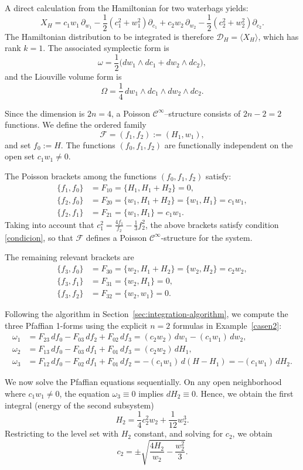 \documentclass{article}
\theoremstyle{remark}
\theoremstyle{definition}
\newcommand{\cinf}{$\mathcal{C}^{\infty}$}
\begin{document}
A direct calculation from the Hamiltonian for two waterbags yields:
\[
X_H
=
c_1 w_1\,\partial_{w_1}
-\frac12(c_1^2+w_1^2)\partial_{c_1}
+
c_2 w_2\,\partial_{w_2}
-\frac12(c_2^2+w_2^2)\partial_{c_2}.
\]
The Hamiltonian distribution to be integrated is therefore $\mathcal D_H=\langle X_H\rangle $,
which has rank $k=1$. The associated symplectic form is
\[
\omega=\frac12\bigl(dw_1\wedge dc_1+dw_2\wedge dc_2\bigr),
\]
and the Liouville volume form is
\[
\Omega=\frac14\,dw_1\wedge dc_1\wedge dw_2\wedge dc_2.
\]

Since the dimension is $2n=4$, a Poisson $\mathcal C^\infty$–structure
consists of $2n-2=2$ functions. We define the ordered family
\[
\mathcal F=(f_1,f_2):=(H_1,w_1),
\]
and set $f_0:=H$.
The functions $(f_0,f_1,f_2)$ are functionally independent on the open
set $c_1w_1\neq0$.


The Poisson brackets among the functions $(f_0,f_1,f_2)$ satisfy:
\begin{align*}
\{f_1,f_0\}&=F_{10}=\{H_1,H_1+H_2\}=0,\\
\{f_2,f_0\}&=F_{20}=\{w_1,H_1+H_2\}=\{w_1,H_1\}=c_1 w_1,\\
\{f_2,f_1\}&=F_{21}=\{w_1,H_1\}=c_1 w_1.
\end{align*}
Taking into account that $c_1^2=\frac{4f_1}{f_2}-\frac13 f_2^2$, the above brackets satisfy condition \eqref{condicion}, so that $\mathcal F$ defines a Poisson \cinf-structure for the system. 

The remaining relevant brackets are
\begin{align*}
\{f_3,f_0\}&=F_{30}=\{w_2,H_1+H_2\}=\{w_2,H_2\}=c_2 w_2,\\
\{f_3,f_1\}&=F_{31}=\{w_2,H_1\}=0,\\
\{f_3,f_2\}&=F_{32}=\{w_2,w_1\}=0.
\end{align*}    


Following the algorithm in Section~\ref{sec:integration-algorithm}, we compute the three Pfaffian 1-forms using the explicit $n=2$ formulas in Example~\ref{casen2}:
\begin{align*}
\omega_1 &= F_{23}\,df_0 - F_{03}\,df_2 + F_{02}\,df_3
= (c_2w_2)\,dw_1 - (c_1w_1)\,dw_2,\\
\omega_2 &= F_{13}\,df_0 - F_{03}\,df_1 + F_{01}\,df_3
= (c_2w_2)\,dH_1,\\
\omega_3 &= F_{12}\,df_0 - F_{02}\,df_1 + F_{01}\,df_2
= -(c_1w_1)\,d(H-H_1)
=-(c_1w_1)\,dH_2.
\end{align*}


We now solve the Pfaffian equations sequentially. On any open neighborhood where $c_1w_1\neq 0$, the equation $\omega_3\equiv 0$ implies $dH_2\equiv 0$. Hence, we obtain the first integral (energy of the second subsystem)
\[
H_2=\frac14c_2^2w_2+\frac{1}{12}w_2^3.
\]
Restricting to the level set with $H_2$ constant, and solving for $c_2$, we obtain
\begin{equation}\label{rel_c2}
c_2 = \pm\sqrt{\frac{4H_2}{w_2} - \frac{w_2^2}{3}}.
\end{equation}
\end{document}
